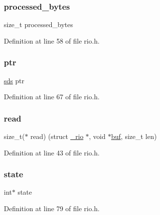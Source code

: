 \subsubsection{\texorpdfstring{processed\+\_\+bytes}{processed\_bytes}}
{\footnotesize\ttfamily size\+\_\+t processed\+\_\+bytes}



Definition at line 58 of file rio.\+h.

\mbox{\label{struct__rio_ac787a06d755eb260b16d6cf74c06eaf9}} 
\subsubsection{\texorpdfstring{ptr}{ptr}}
{\footnotesize\ttfamily \hyperlink{sds_8h_ad69abac3df4532879db9642c95f5ef6f}{sds} ptr}



Definition at line 67 of file rio.\+h.

\mbox{\label{struct__rio_a6562dde444181d8dc56163cd5bd5a880}} 
\subsubsection{\texorpdfstring{read}{read}}
{\footnotesize\ttfamily size\+\_\+t($\ast$ read) (struct \hyperlink{struct__rio}{\+\_\+rio} $\ast$, void $\ast$\hyperlink{struct__rio_ae8dd93102163eea99d3d0949d1974628}{buf}, size\+\_\+t len)}



Definition at line 43 of file rio.\+h.

\mbox{\label{struct__rio_ace50bce9d6e7ed2958418778a6b1711f}} 
\subsubsection{\texorpdfstring{state}{state}}
{\footnotesize\ttfamily int$\ast$ state}



Definition at line 79 of file rio.\+h.

\mbox{\label{struct__rio_ab06eb2e08a6cba498c63adf5e9ffa2ff}} 
